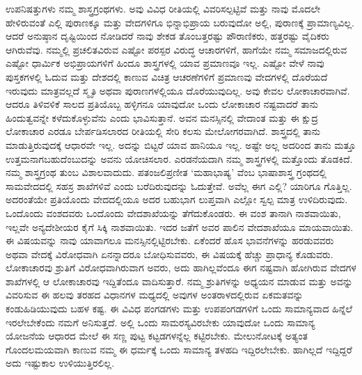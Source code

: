 ಉಪನಿಷತ್ತುಗಳು ನಮ್ಮ ಶಾಸ್ತ್ರಗ್ರಂಥಗಳು. ಅವು ವಿವಿಧ ರೀತಿಯಲ್ಲಿ ವಿವರಿಸಲ್ಪಟ್ಟಿವೆ ಮತ್ತು ನಾವು ಮೊದಲೇ ಹೇಳಿರುವಂತೆ ಎಲ್ಲಿ ಪುರಾಣಕ್ಕೂ ಮತ್ತು ವೇದಗಳಿಗೂ ಭಿನ್ನಾಭಿಪ್ರಾಯ ಬರುವುದೋ ಅಲ್ಲಿ, ಪುರಾಣಕ್ಕೆ ಪ್ರಾಮಾಣ್ಯವಿಲ್ಲ. ಆದರೆ ಅನುಷ್ಠಾನ ದೃಷ್ಟಿಯಿಂದ ನೋಡಿದರೆ ನಾವು ಶೇಕಡ ತೊಂಬತ್ತರಷ್ಟು ಪೌರಾಣಿಕರು, ಹತ್ತರಷ್ಟು ವೈದಿಕರು ಆಗಿರುವೆವು. ನಮ್ಮಲ್ಲಿ ಪ್ರಚಲಿತವಿರುವ ಎಷ್ಟೋ ಪರಸ್ಪರ ವಿರುದ್ಧ ಆಚಾರಗಳಿಗೆ, ಹಾಗೆಯೇ ನಮ್ಮ ಸಮಾಜದಲ್ಲಿರುವ ಎಷ್ಟೋ ಧಾರ್ಮಿಕ ಅಭಿಪ್ರಾಯಗಳಿಗೆ ಹಿಂದೂ ಶಾಸ್ತ್ರಗಳಲ್ಲಿ ಯಾವ ಪ್ರಮಾಣವೂ ಇಲ್ಲ. ಎಷ್ಟೋ ವೇಳೆ ನಾವು ಪುಸ್ತಕಗಳಲ್ಲಿ ಓದುವ ಮತ್ತು ದೇಶದಲ್ಲಿ ಕಾಣುವ ವಿಚಿತ್ರ ಆಚರಣೆಗಳಿಗೆ ಪ್ರಮಾಣವು ವೇದಗಳಲ್ಲಿ ದೊರೆಯದೆ ಇರುವುದು ಮಾತ್ರವಲ್ಲದೆ ಸ್ಮೃತಿ ಅಥವಾ ಪುರಾಣಗಳಲ್ಲಿಯೂ ದೊರೆಯುವುದಿಲ್ಲ. ಅವು ಕೇವಲ ಲೋಕಾಚಾರವಾಗಿವೆ. ಆದರೂ ತಿಳಿವಳಿಕೆ ಸಾಲದ ಪ್ರತಿಯೊಬ್ಬ ಹಳ್ಳಿಗನೂ ಯಾವುದೋ ಒಂದು ಲೋಕಾಚಾರ ನಷ್ಟವಾದರೆ ತಾನು ಹಿಂದುತ್ವವನ್ನೇ ಕಳೆದುಕೊಳ್ಳುವೆನು ಎಂದು ಭಾವಿಸುತ್ತಾನೆ. ಅವನ ಮನಸ್ಸಿನಲ್ಲಿ ವೇದಾಂತ ಮತ್ತು ಈ ಕ್ಷುದ್ರ ಲೋಕಾಚಾರ ಎರಡೂ ಬೇರ್ಪಡಿಸಲಾರದ ರೀತಿಯಲ್ಲಿ ಸೇರಿ ಕಲಸು ಮೇಲೋಗರವಾಗಿದೆ. ಶಾಸ್ತ್ರದಲ್ಲಿ ತಾನು ಮಾಡುತ್ತಿರುವುದಕ್ಕೆ ಆಧಾರವೇ ಇಲ್ಲ. ಅದನ್ನು ಬಿಟ್ಟರೆ ಯಾವ ಹಾನಿಯೂ ಇಲ್ಲ. ಅಷ್ಟೇ ಅಲ್ಲ ಅದರಿಂದ ತಾನು ಮತ್ತೂ ಉತ್ತಮನಾಗಬಹುದೆಂಬುದನ್ನು ಅವನು ಯೋಚಿಸಲಾರ. ಎರಡನೆಯದಾಗಿ ನಮ್ಮ ಶಾಸ್ತ್ರಗಳಲ್ಲಿ ಮತ್ತೊಂದು ತೊಡಕಿದೆ. ನಮ್ಮ ಶಾಸ್ತ್ರಗ್ರಂಥ ತುಂಬ ವಿಶಾಲವಾದುದು. ಪತಂಜಲಿಪ್ರಣೀತ ‘ಮಹಾಭಾಷ್ಯ’ ವೆಂಬ ಭಾಷಾಶಾಸ್ತ್ರ ಗ್ರಂಥದಲ್ಲಿ ಸಾಮವೇದದಲ್ಲಿ ಸಹಸ್ರ ಶಾಖೆಗಳಿವೆ ಎಂದು ಬರೆದಿರುವುದನ್ನು ಓದುತ್ತೇವೆ. ಅವೆಲ್ಲ ಈಗ ಎಲ್ಲಿ? ಯಾರಿಗೂ ಗೊತ್ತಿಲ್ಲ. ಅದರಂತೆಯೇ ಪ್ರತಿಯೊಂದು ವೇದದಲ್ಲಿಯೂ ಅದರ ಬಹುಭಾಗ ಲುಪ್ತವಾಗಿ ಎಲ್ಲೋ ಸ್ವಲ್ಪ ಮಾತ್ರ ಉಳಿದಿರುವುದು. ಒಂದೊಂದು ವಂಶದವರು ಒಂದೊಂದು ವೇದಶಾಖೆಯನ್ನು ತೆಗೆದುಕೊಂಡರು. ಈ ವಂಶ ತಾನಾಗಿ ನಾಶವಾಯಿತು, ಇಲ್ಲವೇ ಅನ್ಯದೇಶೀಯರ ಕೈಗೆ ಸಿಕ್ಕಿ ನಾಶವಾಯಿತು. ಇದರ ಜತೆಗೆ ಅವರ ಪಾಲಿನ ವೇದಶಾಖೆಯೂ ಮಾಯವಾಯಿತು. ಈ ವಿಷಯವನ್ನು ನಾವು ಯಾವಾಗಲೂ ಮನಸ್ಸಿನಲ್ಲಿಟ್ಟಿರಬೇಕು. ಏಕೆಂದರೆ ಹೊಸ ಭಾವನೆಗಳನ್ನು ಹರಡುವವರು ಅಥವಾ ವೇದಕ್ಕೆ ವಿರೋಧವಾಗಿ ಏನನ್ನಾದರೂ ಬೋಧಿಸುವವರು, ಈ ವಿಷಯಕ್ಕೆ ಹೆಚ್ಚು ಪ್ರಾಧಾನ್ಯ ಕೊಡುವರು. ಲೋಕಾಚಾರವು ಶ್ರುತಿಗೆ ವಿರೋಧವಾಗಿರುವಾಗ ಅವರು, ಅದು ಹಾಗಿಲ್ಲವೆಂದೂ ಈಗ ನಷ್ಟವಾಗಿ ಹೋಗಿರುವ ವೇದಗಳ ಶಾಖೆಗಳಲ್ಲಿ ಆ ಲೋಕಾಚಾರವು ಇದ್ದಿತೆಂದೂ ವಾದಿಸುತ್ತಾರೆ. ನಮ್ಮ ಶ್ರುತಿಗಳನ್ನು ಅಧ್ಯಯನ ಮಾಡುವ ಮತ್ತು ಅವನ್ನು ವಿವರಿಸುವ ಈ ಹಲವು ತರಹದ ವಿಧಾನಗಳ ಮಧ್ಯದಲ್ಲಿ ಅವುಗಳ ಅಂತರಾಳದಲ್ಲಿರುವ ಏಕಮತವನ್ನು ಕಂಡುಹಿಡಿಯುವುದು ಬಹಳ ಕಷ್ಟ. ಈ ವಿವಿಧ ಪಂಗಡಗಳು ಮತ್ತು ಉಪಪಂಗಡಗಳಿಗೆ ಒಂದು ಸಾಮಾನ್ಯವಾದ ಹಿನ್ನೆಲೆ ಇರಲೇಬೇಕೆಂದು ನಮಗೆ ಅನಿಸುತ್ತದೆ. ಅಲ್ಲಿ ಒಂದು ಸಾಮರಸ್ಯವಿರಬೇಕು ಯಾವುದೋ ಒಂದು ಸಾಮಾನ್ಯ ಯೋಜನೆಯ ಆಧಾರದ ಮೇಲೆ ಈ ಸಣ್ಣ ಪುಟ್ಟ ಕಟ್ಟಡಗಳನ್ನೆಲ್ಲ ಕಟ್ಟಿರಬೇಕು. ಮೇಲುನೋಟಕ್ಕೆ ಅತ್ಯಂತ ಗೊಂದಲಮಯವಾಗಿ ಕಾಣುವ ನಮ್ಮ ಈ ಧರ್ಮಕ್ಕೆ ಒಂದು ಸಾಮಾನ್ಯ ತಳಹದಿ ಇದ್ದಿರಲೇಬೇಕು. ಹಾಗಿಲ್ಲದೆ ಇದ್ದಿದ್ದರೆ ಅದು ಇಷ್ಟುಕಾಲ ಉಳಿಯುತ್ತಿರಲಿಲ್ಲ.

